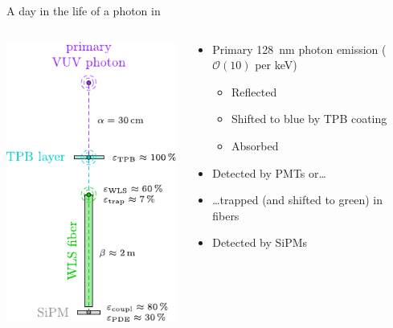 \documentclass[10pt,aspectratio=169]{beamer}
\begin{document}
\begin{frame}{A day in the life of a photon in \gerda}
  \begin{columns}
    \begin{column}{0.3\textwidth}
      \includegraphics[height=0.85\textheight]{light-coll-chain.pdf}
    \end{column}
    \begin{column}{0.7\textwidth}
      \begin{itemize}
        \item Primary 128~nm photon emission ($\mathcal{O}(10)$ per keV)
          \begin{itemize}
            \item Reflected
            \item Shifted to blue by TPB coating
            \item Absorbed
          \end{itemize}
        \item Detected by PMTs or\ldots
        \item \ldots{}trapped (and shifted to green) in fibers
        \item Detected by SiPMs
      \end{itemize}
    \end{column}
  \end{columns}
\end{frame}
\end{document}
